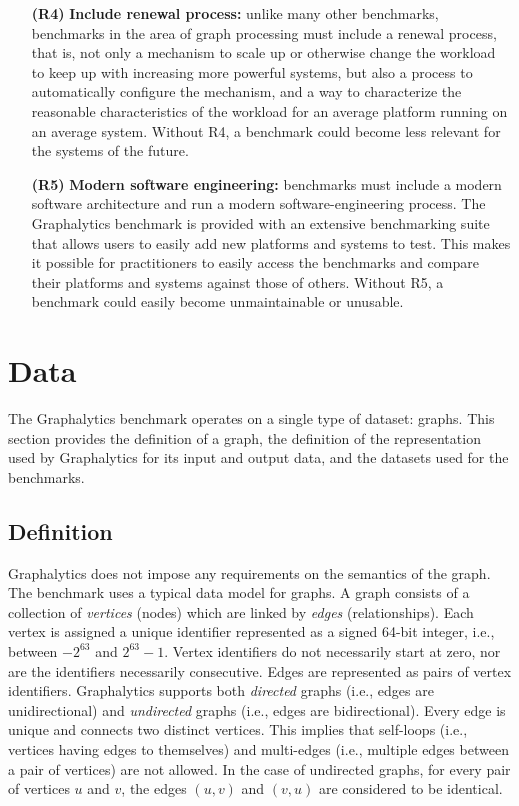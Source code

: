 \begin{itemize}
\item[\textbf{(R4)}] \textbf{Include renewal process:} unlike many other benchmarks, benchmarks in the area of graph processing must include a renewal process, that is, not only a mechanism to scale up or otherwise change the workload to keep up with increasing more powerful systems, but also a process to automatically configure the mechanism, and a way to characterize the reasonable characteristics of the workload for an average platform running on an average system. Without R4, a benchmark could become less relevant for the systems of the future.

\item[\textbf{(R5)}] \textbf{Modern software engineering:} benchmarks must include a modern software architecture and run a modern software-engineering process. The Graphalytics benchmark is provided with an extensive benchmarking suite that allows users to easily add new platforms and systems to test. This makes it possible for practitioners to easily access the benchmarks and compare their platforms and systems against those of others. Without R5, a benchmark could easily become unmaintainable or unusable.
\end{itemize}


\section{Data}
The Graphalytics benchmark operates on a single type of dataset: graphs. This section provides the definition of a graph, the definition of the representation used by Graphalytics for its input and output data, and the datasets used for the benchmarks.

\subsection{Definition}
Graphalytics does not impose any requirements on the semantics of the graph. The benchmark uses a typical data model for graphs. A graph consists of a collection of \emph{vertices} (nodes) which are linked by \emph{edges} (relationships).  Each vertex is assigned a unique identifier represented as a signed 64-bit integer, i.e., between $-2^{63}$ and $2^{63}-1$. Vertex identifiers do not necessarily start at zero, nor are the identifiers necessarily consecutive. Edges are represented as pairs of vertex identifiers. Graphalytics supports both \emph{directed} graphs (i.e., edges are unidirectional) and \emph{undirected} graphs (i.e., edges are bidirectional). Every edge is unique and connects two distinct vertices. This implies that self-loops (i.e., vertices having edges to themselves) and multi-edges (i.e., multiple edges between a pair of vertices) are not allowed. In the case of undirected graphs, for every pair of vertices $u$ and $v$, the edges $(u,v)$ and $(v,u)$ are considered to be identical.

